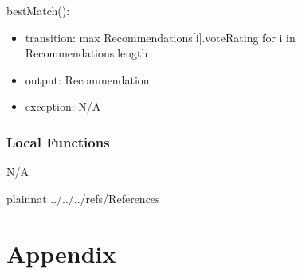 \documentclass[12pt, titlepage]{article}
\begin{document}
\noindent bestMatch():
\begin{itemize}
	\item transition: max Recommendations[i].voteRating for i in Recommendations.length 
	\item output: Recommendation
	\item exception: N/A
\end{itemize}

\subsubsection{Local Functions}
N/A

\newpage

 {plainnat}
 {../../../refs/References}

\newpage

\section{Appendix} \label{Appendix}

\end{document}
